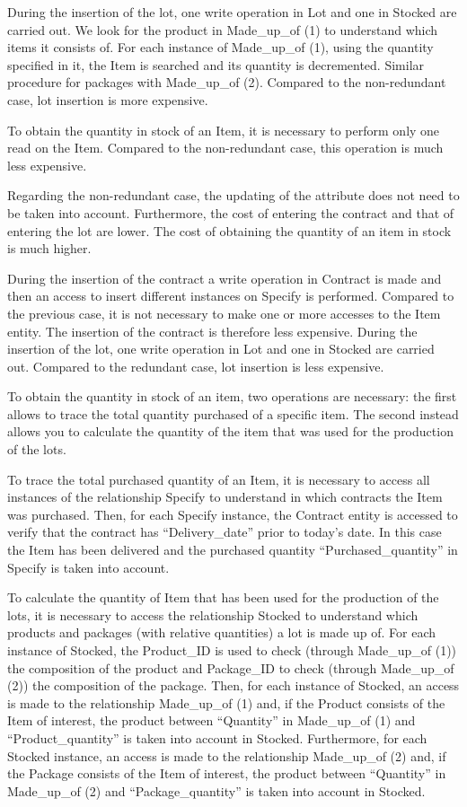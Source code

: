 During the insertion of the lot, one write operation in Lot and one in Stocked are carried out. We look for the product in Made\_up\_of (1) to understand which items it consists of. For each instance of Made\_up\_of (1), using the quantity specified in it, the Item is searched and its quantity is decremented. Similar procedure for packages with Made\_up\_of (2). Compared to the non-redundant case, lot insertion is more expensive.

To obtain the quantity in stock of an Item, it is necessary to perform only one read on the Item. Compared to the non-redundant case, this operation is much less expensive.

Regarding the non-redundant case, the updating of the attribute does not need to be taken into account. Furthermore, the cost of entering the contract and that of entering the lot are lower. The cost of obtaining the quantity of an item in stock is much higher.

During the insertion of the contract a write operation in Contract is made and then an access to insert different instances on Specify is performed. Compared to the previous case, it is not necessary to make one or more accesses to the Item entity. The insertion of the contract is therefore less expensive.
During the insertion of the lot, one write operation in Lot and one in Stocked are carried out. Compared to the redundant case, lot insertion is less expensive.

To obtain the quantity in stock of an item, two operations are necessary: the first allows to trace the total quantity purchased of a specific item. The second instead allows you to calculate the quantity of the item that was used for the production of the lots.

To trace the total purchased quantity of an Item, it is necessary to access all instances of the relationship Specify to understand in which contracts the Item was purchased. Then, for each Specify instance, the Contract entity is accessed to verify that the contract has ``Delivery\_date'' prior to today's date. In this case the Item has been delivered and the purchased quantity ``Purchased\_quantity'' in Specify is taken into account.

To calculate the quantity of Item that has been used for the production of the lots, it is necessary to access the relationship Stocked to understand which products and packages (with relative quantities) a lot is made up of. For each instance of Stocked, the Product\_ID is used to check (through Made\_up\_of (1)) the composition of the product and Package\_ID to check (through Made\_up\_of (2)) the composition of the package. Then, for each instance of Stocked, an access is made to the relationship Made\_up\_of (1) and, if the Product consists of the Item of interest, the product between ``Quantity'' in Made\_up\_of (1) and ``Product\_quantity'' is taken into account in Stocked. Furthermore, for each Stocked instance, an access is made to the relationship Made\_up\_of (2) and, if the Package consists of the Item of interest, the product between ``Quantity'' in Made\_up\_of (2) and ``Package\_quantity'' is taken into account in Stocked.

